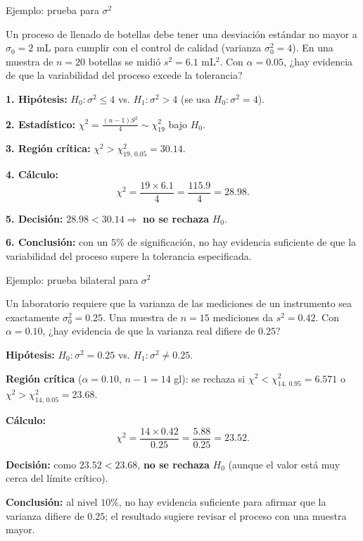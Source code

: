 \documentclass[aspectratio=169,11pt]{beamer}
\begin{document}
\begin{frame}{Ejemplo: prueba para $\sigma^2$}
\begin{example}
Un proceso de llenado de botellas debe tener una desviación estándar no mayor a $\sigma_0=2$ mL para cumplir con el control de calidad (varianza $\sigma_0^2=4$). En una muestra de $n=20$ botellas se midió $s^2=6.1$ mL$^2$. Con $\alpha=0.05$, ¿hay evidencia de que la variabilidad del proceso excede la tolerancia?

\textbf{1. Hipótesis:} $H_0:\sigma^2\le4$ vs. $H_1:\sigma^2>4$ (se usa $H_0:\sigma^2=4$).

\textbf{2. Estadístico:} $\displaystyle \chi^2=\frac{(n-1)S^2}{4}\sim\chi^2_{19}$ bajo $H_0$.

\textbf{3. Región crítica:} $\chi^2>\chi^2_{19,\,0.05}=30.14$.

\textbf{4. Cálculo:}
\[
\chi^2=\frac{19\times6.1}{4}=\frac{115.9}{4}=28.98.
\]

\textbf{5. Decisión:} $28.98<30.14 \Rightarrow$ \textbf{no se rechaza} $H_0$.

\textbf{6. Conclusión:} con un $5\%$ de significación, no hay evidencia suficiente de que la variabilidad del proceso supere la tolerancia especificada.
\end{example}
\end{frame}

\begin{frame}{Ejemplo: prueba bilateral para $\sigma^2$}
\begin{example}
Un laboratorio requiere que la varianza de las mediciones de un instrumento sea exactamente $\sigma_0^2=0.25$. Una muestra de $n=15$ mediciones da $s^2=0.42$. Con $\alpha=0.10$, ¿hay evidencia de que la varianza real difiere de $0.25$?

\textbf{Hipótesis:} $H_0:\sigma^2=0.25$ vs. $H_1:\sigma^2\neq0.25$.

\textbf{Región crítica} ($\alpha=0.10$, $n-1=14$ gl): se rechaza si $\chi^2<\chi^2_{14,\,0.95}=6.571$ o $\chi^2>\chi^2_{14,\,0.05}=23.68$.

\textbf{Cálculo:}
\[
\chi^2=\frac{14\times0.42}{0.25}=\frac{5.88}{0.25}=23.52.
\]

\textbf{Decisión:} como $23.52<23.68$, \textbf{no se rechaza} $H_0$ (aunque el valor está muy cerca del límite crítico).

\textbf{Conclusión:} al nivel $10\%$, no hay evidencia suficiente para afirmar que la varianza difiere de $0.25$; el resultado sugiere revisar el proceso con una muestra mayor.
\end{example}
\end{frame}
\end{document}

